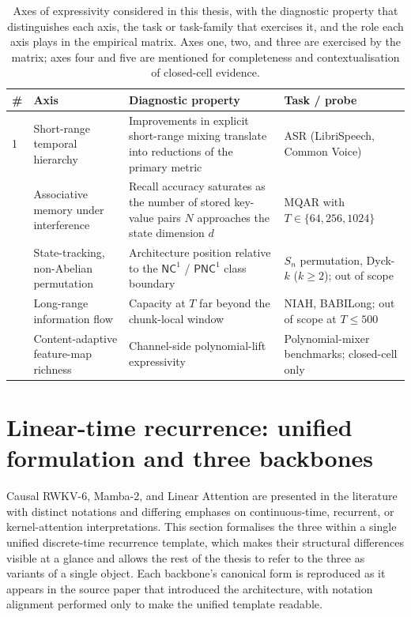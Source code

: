 \begin{table}[t]
\centering
\small
\caption[Axes of expressivity for causal linear-time RNNs]{Axes of
expressivity considered in this thesis, with the diagnostic property
that distinguishes each axis, the task or task-family that exercises
it, and the role each axis plays in the empirical matrix. Axes one,
two, and three are exercised by the matrix; axes four and five are
mentioned for completeness and contextualisation of closed-cell
evidence.}
\label{tab:axes}
\setlength{\tabcolsep}{4pt}
\renewcommand{\arraystretch}{1.15}
\begin{tabularx}{\linewidth}{@{}p{0.4cm} p{3.0cm} X p{3.0cm}@{}}
\toprule
\textbf{\#} & \textbf{Axis} & \textbf{Diagnostic property} & \textbf{Task / probe} \\
\midrule
1 &
Short-range temporal hierarchy &
Improvements in explicit short-range mixing translate into
reductions of the primary metric &
ASR (LibriSpeech, Common Voice) \\
\addlinespace
2 &
Associative memory under interference &
Recall accuracy saturates as the number of stored key-value pairs
$N$ approaches the state dimension $d$ &
MQAR with $T \in \{64, 256, 1024\}$ \\
\addlinespace
3 &
State-tracking, non-Abelian permutation &
Architecture position relative to the $\mathsf{NC}^{1}$ /
$\mathsf{PNC}^{1}$ class boundary &
$S_{n}$ permutation, Dyck-$k$ ($k \ge 2$); out of scope \\
\addlinespace
4 &
Long-range information flow &
Capacity at $T$ far beyond the chunk-local window &
NIAH, BABILong; out of scope at $T \le 500$ \\
\addlinespace
5 &
Content-adaptive feature-map richness &
Channel-side polynomial-lift expressivity &
Polynomial-mixer benchmarks; closed-cell only \\
\bottomrule
\end{tabularx}
\end{table}

\section{Linear-time recurrence: unified formulation and three backbones}\label{sec:backbones}

Causal RWKV-6, Mamba-2, and Linear Attention are presented in the
literature with distinct notations and differing emphases on
continuous-time, recurrent, or kernel-attention interpretations. This
section formalises the three within a single unified discrete-time
recurrence template, which makes their structural differences visible
at a glance and allows the rest of the thesis to refer to the three
as variants of a single object. Each backbone's canonical form is
reproduced as it appears in the source paper that introduced the
architecture, with notation alignment performed only to make the
unified template readable.

